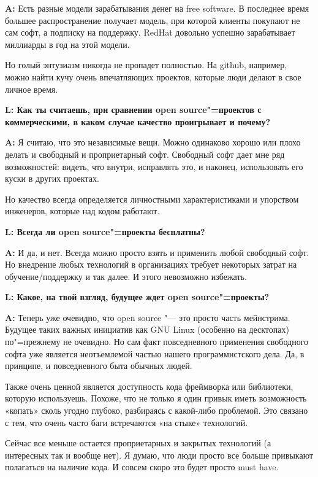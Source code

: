 \documentclass[10pt, a5paper]{article}
\begin{document}
{\noindent \bf A:} Есть разные модели зарабатывания денег на free software. В последнее время большее распространение получает модель, при которой клиенты покупают не сам софт, а подписку на поддержку. RedHat довольно успешно зарабатывает миллиарды в год на этой модели.

Но голый энтузиазм никогда не пропадет полностью. На github, например, можно найти кучу очень впечатляющих проектов, которые люди делают в свое личное время.


{\noindent \bf L:  Как ты считаешь, при сравнении open source"=проектов с коммерческими, в каком случае качество проигрывает и почему?}

{\noindent \bf A:} Я считаю, что это независимые вещи. Можно одинаково хорошо или плохо делать и свободный и проприетарный софт. Свободный софт дает мне ряд возможностей: видеть, что внутри, исправлять это, и наконец, использовать его куски в других проектах. 

Но качество всегда определяется личностными характеристиками и упорством инженеров, которые над кодом работают.

{\noindent \bf L:  Всегда ли open source"=проекты бесплатны?}

{\noindent \bf A:} И да, и нет. Всегда можно просто взять и применить любой свободный софт. Но внедрение любых технологий в организациях требует некоторых затрат на обучение/поддержку и так далее. И этого невозможно избежать.


{\noindent \bf L:  Какое, на твой взгляд, будущее ждет open source"=проекты?}

{\noindent \bf A:} Теперь уже очевидно, что open source "--- это просто часть мейнстрима. Будущее таких важных инициатив как GNU Linux (особенно на десктопах) по"=прежнему не очевидно. Но сам факт повседневного применения свободного софта уже является неотъемлемой частью нашего программистского дела. Да, в принципе, и повседневного быта обычных людей.

Также очень ценной является доступность кода фреймворка или библиотеки, которую используешь. Похоже, что не только я один привык иметь возможность «копать» сколь угодно глубоко, разбираясь с какой-либо проблемой. Это связано с тем, что очень часто баги встречаются «на стыке» технологий.

Сейчас все меньше остается проприетарных и закрытых технологий (а интересных так и вообще нет). Я думаю, что люди просто все больше привыкают полагаться на наличие кода. И совсем скоро это будет просто must have.
\end{document}
